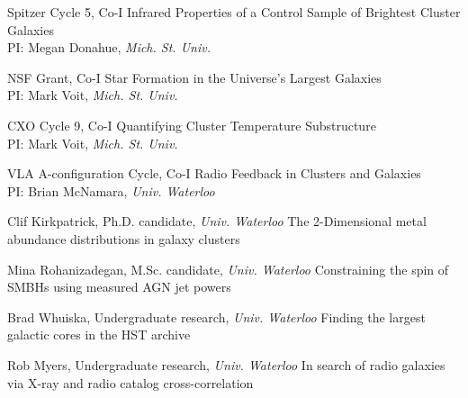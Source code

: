 \documentclass[11pt]{cv}
\begin{document}
\begin{llist}
Spitzer Cycle 5, Co-I
Infrared Properties of a Control Sample of Brightest Cluster Galaxies\\%
PI: Megan Donahue, {\textit{Mich. St. Univ.}}

NSF Grant, Co-I
Star Formation in the Universe's Largest Galaxies\\%
PI: Mark Voit, {\textit{Mich. St. Univ.}}

CXO Cycle 9, Co-I
Quantifying Cluster Temperature Substructure\\%
PI: Mark Voit, {\textit{Mich. St. Univ.}}

VLA A-configuration Cycle, Co-I
Radio Feedback in Clusters and Galaxies\\%
PI: Brian McNamara, {\textit{Univ. Waterloo}}


Clif Kirkpatrick, Ph.D. candidate, {\textit{Univ. Waterloo}}
The 2-Dimensional metal abundance distributions in galaxy clusters

Mina Rohanizadegan, M.Sc. candidate, {\textit{Univ. Waterloo}}
Constraining the spin of SMBHs using measured AGN jet powers

Brad Whuiska, Undergraduate research, {\textit{Univ. Waterloo}}
Finding the largest galactic cores in the HST archive

Rob Myers, Undergraduate research, {\textit{Univ. Waterloo}}
In search of radio galaxies via X-ray and radio catalog cross-correlation






\end{llist}
\end{document}
